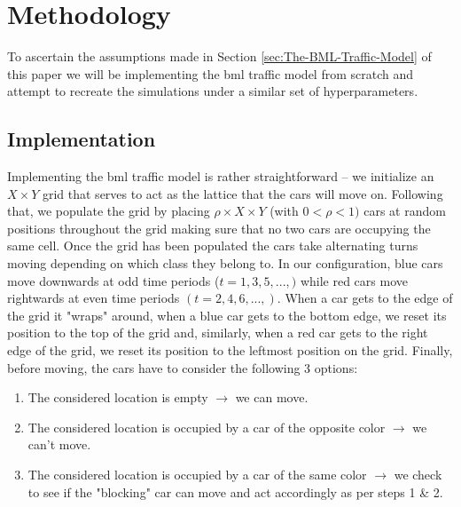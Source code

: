 \section{Methodology}
\label{sec:Methodology}
To ascertain the assumptions made in Section \ref{sec:The-BML-Traffic-Model} of this paper we will be implementing the \gls{bml} traffic model from scratch and attempt to recreate the simulations under a similar set of hyperparameters.

\subsection{Implementation}
\label{subsec:Methodology:Implementation}
Implementing the \gls{bml} traffic model is rather straightforward -- we initialize an $X \times Y$ grid that serves to act as the lattice that the cars will move on. Following that, we populate the grid by placing $\rho \times X \times Y$ (with $0 < \rho < 1)$ cars at random positions throughout the grid making sure that no two cars are occupying the same cell. Once the grid has been populated the cars take alternating turns moving depending on which class they belong to. In our configuration, blue cars move downwards at odd time periods ($t = 1, 3, 5, ...,)$ while red cars move rightwards at even time periods $(t = 2, 4, 6, ...,)$. When a car gets to the edge of the grid it "wraps" around, \eg when a blue car gets to the bottom edge, we reset its position to the top of the grid and, similarly, when a red car gets to the right edge of the grid, we reset its position to the leftmost position on the grid. Finally, before moving, the cars have to consider the following 3 options:

\begin{enumerate}
    \item The considered location is empty $\rightarrow$ we can move.
    \item The considered location is occupied by a car of the opposite color $\rightarrow$ we can't move.
    \item The considered location is occupied by a car of the same color $\rightarrow$ we check to see if the "blocking" car can move and act accordingly as per steps 1 \& 2.
\end{enumerate}


